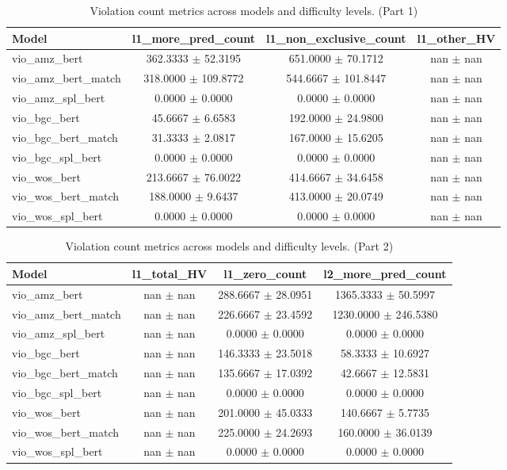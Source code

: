 \begin{table}[htbp]
\centering
\small
\begin{tabular}{lccc}
\toprule
Model & l1_more\_pred\_count & l1_non\_exclusive\_count & l1_other\_HV \\
\midrule
vio\_amz\_bert & 362.3333 $\pm$ 52.3195 & 651.0000 $\pm$ 70.1712 & nan $\pm$ nan \\
vio\_amz\_bert\_match & 318.0000 $\pm$ 109.8772 & 544.6667 $\pm$ 101.8447 & nan $\pm$ nan \\
vio\_amz\_spl\_bert & 0.0000 $\pm$ 0.0000 & 0.0000 $\pm$ 0.0000 & nan $\pm$ nan \\
vio\_bgc\_bert & 45.6667 $\pm$ 6.6583 & 192.0000 $\pm$ 24.9800 & nan $\pm$ nan \\
vio\_bgc\_bert\_match & 31.3333 $\pm$ 2.0817 & 167.0000 $\pm$ 15.6205 & nan $\pm$ nan \\
vio\_bgc\_spl\_bert & 0.0000 $\pm$ 0.0000 & 0.0000 $\pm$ 0.0000 & nan $\pm$ nan \\
vio\_wos\_bert & 213.6667 $\pm$ 76.0022 & 414.6667 $\pm$ 34.6458 & nan $\pm$ nan \\
vio\_wos\_bert\_match & 188.0000 $\pm$ 9.6437 & 413.0000 $\pm$ 20.0749 & nan $\pm$ nan \\
vio\_wos\_spl\_bert & 0.0000 $\pm$ 0.0000 & 0.0000 $\pm$ 0.0000 & nan $\pm$ nan \\
\bottomrule
\end{tabular}
\caption{Violation count metrics across models and difficulty levels. (Part 1)}
\label{tab:vio_metrics_part1}
\end{table}

\begin{table}[htbp]
\centering
\small
\begin{tabular}{lccc}
\toprule
Model & l1_total\_HV & l1_zero\_count & l2_more\_pred\_count \\
\midrule
vio\_amz\_bert & nan $\pm$ nan & 288.6667 $\pm$ 28.0951 & 1365.3333 $\pm$ 50.5997 \\
vio\_amz\_bert\_match & nan $\pm$ nan & 226.6667 $\pm$ 23.4592 & 1230.0000 $\pm$ 246.5380 \\
vio\_amz\_spl\_bert & nan $\pm$ nan & 0.0000 $\pm$ 0.0000 & 0.0000 $\pm$ 0.0000 \\
vio\_bgc\_bert & nan $\pm$ nan & 146.3333 $\pm$ 23.5018 & 58.3333 $\pm$ 10.6927 \\
vio\_bgc\_bert\_match & nan $\pm$ nan & 135.6667 $\pm$ 17.0392 & 42.6667 $\pm$ 12.5831 \\
vio\_bgc\_spl\_bert & nan $\pm$ nan & 0.0000 $\pm$ 0.0000 & 0.0000 $\pm$ 0.0000 \\
vio\_wos\_bert & nan $\pm$ nan & 201.0000 $\pm$ 45.0333 & 140.6667 $\pm$ 5.7735 \\
vio\_wos\_bert\_match & nan $\pm$ nan & 225.0000 $\pm$ 24.2693 & 160.0000 $\pm$ 36.0139 \\
vio\_wos\_spl\_bert & nan $\pm$ nan & 0.0000 $\pm$ 0.0000 & 0.0000 $\pm$ 0.0000 \\
\bottomrule
\end{tabular}
\caption{Violation count metrics across models and difficulty levels. (Part 2)}
\label{tab:vio_metrics_part2}
\end{table}

